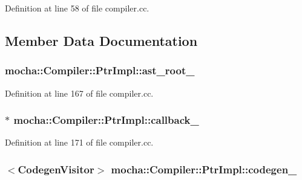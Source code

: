 Definition at line 58 of file compiler.cc.



\subsection{Member Data Documentation}
\hypertarget{classmocha_1_1_compiler_1_1_ptr_impl_aa3e10b635c9b30e4b6ae1f8231e09655}{
\subsubsection[{ast\_\-root\_\-}]{ {\bf mocha::Compiler::PtrImpl::ast\_\-root\_\-}}}
\label{classmocha_1_1_compiler_1_1_ptr_impl_aa3e10b635c9b30e4b6ae1f8231e09655}


Definition at line 167 of file compiler.cc.

\hypertarget{classmocha_1_1_compiler_1_1_ptr_impl_afe8e99051d3858bb1eb62c6d079ab40f}{
\subsubsection[{callback\_\-}]{$\ast$ {\bf mocha::Compiler::PtrImpl::callback\_\-}}}
\label{classmocha_1_1_compiler_1_1_ptr_impl_afe8e99051d3858bb1eb62c6d079ab40f}


Definition at line 171 of file compiler.cc.

\hypertarget{classmocha_1_1_compiler_1_1_ptr_impl_a95fb6e134b0d031f52ce39a7e349ee8f}{
\subsubsection[{codegen\_\-}]{$<${\bf CodegenVisitor}$>$ {\bf mocha::Compiler::PtrImpl::codegen\_\-}}}
\label{classmocha_1_1_compiler_1_1_ptr_impl_a95fb6e134b0d031f52ce39a7e349ee8f}


